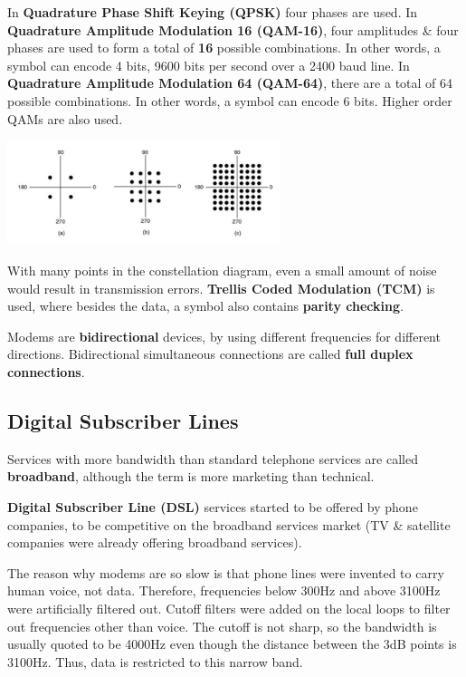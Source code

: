 \documentclass[11pt]{article}
\begin{document}
In \textbf{Quadrature Phase Shift Keying (QPSK)} four phases are used. 
In \textbf{Quadrature Amplitude Modulation 16 (QAM-16)}, four amplitudes \& four phases are used to form a total of \textbf{16} 
possible combinations. 
In other words, a symbol can encode 4 bits, 9600 bits per second over a 2400 baud line.
In \textbf{Quadrature Amplitude Modulation 64 (QAM-64)}, there are a total of 64 possible combinations.
In other words, a symbol can encode 6 bits.
Higher order QAMs are also used. 

\begin{center}
    \includegraphics[width=0.6\textwidth]{moreaboutmodems.png}
\end{center}

With many points in the constellation diagram, even a small amount of noise would result in transmission errors.
\textbf{Trellis Coded Modulation (TCM)} is used, where besides the data, a symbol also contains \textbf{parity checking}. 

Modems are \textbf{bidirectional} devices, by using different frequencies for different directions. 
Bidirectional simultaneous connections are called \textbf{full duplex connections}.

\subsection{Digital Subscriber Lines} 
Services with more bandwidth than standard telephone services are called \textbf{broadband}, although the term is more 
marketing than technical. 

\textbf{Digital Subscriber Line (DSL)} services started to be offered by phone companies, to be competitive on the broadband 
services market (TV \& satellite companies were already offering broadband services). 

The reason why modems are so slow is that phone lines were invented to carry human voice, not data. 
Therefore, frequencies below 300Hz and above 3100Hz were artificially filtered out. 
Cutoff filters were added on the local loops to filter out frequencies other than voice. 
The cutoff is not sharp, so the bandwidth is usually quoted to be 4000Hz even though the distance between the 3dB points is 
3100Hz. 
Thus, data is restricted to this narrow band. 
\end{document}
